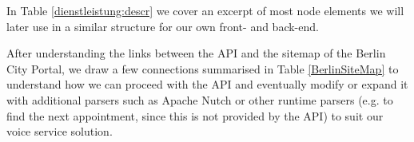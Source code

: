 In Table \ref{dienstleistung:descr} we cover an excerpt of most node elements we will later use %
in a similar structure for our own front- and back-end. 

After understanding the links between the API and the sitemap of the Berlin City Portal, we draw a few connections summarised in Table \ref{BerlinSiteMap} to understand how we can proceed with the API and eventually modify or expand it with additional parsers such as Apache Nutch or other runtime parsers (e.g. to find the next appointment, since this is not provided by the API) to suit our voice service solution.







